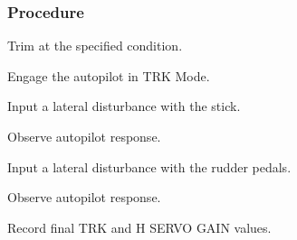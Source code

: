  \subsubsection*{Procedure}
 \begin{compactenum}
    \item Trim at the specified condition.
    \item Engage the autopilot in TRK Mode.
    \item Input a lateral disturbance with the stick.  
    \item Observe autopilot response.
    \item Input a lateral disturbance with the rudder pedals.  
    \item Observe autopilot response.
    \item Record final TRK and H SERVO GAIN values.
    \end{compactenum}
